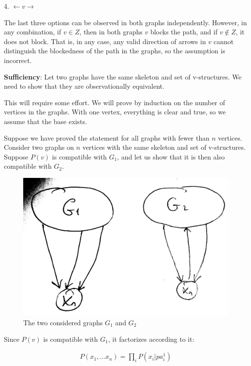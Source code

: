 \documentclass[fleqn]{article}
\numberwithin{equation}{section}
\numberwithin{theorem}{section}
\numberwithin{figure}{section}
\numberwithin{lemma}{section}
\numberwithin{corollary}{section}
\begin{document}
4. \( \leftarrow v \rightarrow \)

The last three options can be observed in both graphs independently. However, in any combination, if \( v \in Z \), then in both graphs \( v \) blocks the path, and if \( v \notin Z \), it does not block. That is, in any case, any valid direction of arrows in \( v \) cannot distinguish the blockedness of the path in the graphs, so the assumption is incorrect.

\textbf{Sufficiency}: Let two graphs have the same skeleton and set of v-structures. We need to show that they are observationally equivalent.

This will require some effort. We will prove by induction on the number of vertices in the graphs. With one vertex, everything is clear and true, so we assume that the base exists.

Suppose we have proved the statement for all graphs with fewer than \( n \) vertices. Consider two graphs on \( n \) vertices with the same skeleton and set of v-structures. Suppose \( P(v) \) is compatible with \( G_1 \), and let us show that it is then also compatible with \( G_2 \).

\begin{figure}[h]
	\begin{center}
		\includegraphics[scale=0.1]{imgs/img10.png}
	\end{center}
	\caption{The two considered graphs \( G_1 \) and \( G_2 \)}
	\label{fig:equiv1}
\end{figure}

Since \( P(v) \) is compatible with \( G_1 \), it factorizes according to it:

\begin{align}
	P(x_1,...x_n) = \prod\limits_{i}P(x_i|pa^1_{i})
\end{align}
\end{document}

